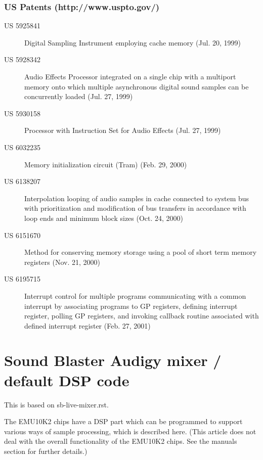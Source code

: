 \documentclass[a4paper,8pt,english]{sphinxmanual}
\begin{document}
\subsubsection{US Patents (http://www.uspto.gov/)}
\label{sound/cards/sb-live-mixer:us-patents-http-www-uspto-gov}\begin{description}
\item[{US 5925841}] \leavevmode
Digital Sampling Instrument employing cache memory (Jul. 20, 1999)

\item[{US 5928342}] \leavevmode
Audio Effects Processor integrated on a single chip
with a multiport memory onto which multiple asynchronous
digital sound samples can be concurrently loaded
(Jul. 27, 1999)

\item[{US 5930158}] \leavevmode
Processor with Instruction Set for Audio Effects (Jul. 27, 1999)

\item[{US 6032235}] \leavevmode
Memory initialization circuit (Tram) (Feb. 29, 2000)

\item[{US 6138207}] \leavevmode
Interpolation looping of audio samples in cache connected to
system bus with prioritization and modification of bus transfers
in accordance with loop ends and minimum block sizes
(Oct. 24, 2000)

\item[{US 6151670}] \leavevmode
Method for conserving memory storage using a
pool of  short term memory registers
(Nov. 21, 2000)

\item[{US 6195715}] \leavevmode
Interrupt control for multiple programs communicating with
a common interrupt by associating programs to GP registers,
defining interrupt register, polling GP registers, and invoking
callback routine associated with defined interrupt register
(Feb. 27, 2001)

\end{description}


\section{Sound Blaster Audigy mixer / default DSP code}
\label{sound/cards/audigy-mixer:sound-blaster-audigy-mixer-default-dsp-code}\label{sound/cards/audigy-mixer::doc}
This is based on sb-live-mixer.rst.

The EMU10K2 chips have a DSP part which can be programmed to support
various ways of sample processing, which is described here.
(This article does not deal with the overall functionality of the
EMU10K2 chips. See the manuals section for further details.)
\end{document}
